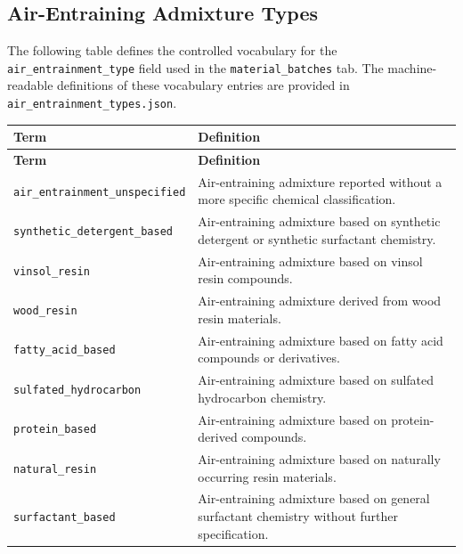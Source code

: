 \documentclass[11pt]{book}
\begin{document}
{\subsection{Air-Entraining Admixture Types}
\label{vocab:air_entrainment_type_list}

The following table defines the controlled vocabulary for the \texttt{air\_entrainment\_type} field used in the \texttt{material\_batches} tab. The machine-readable definitions of these vocabulary entries are provided in \texttt{air\_entrainment\_types.json}.

\begin{longtable}{p{}p{}}
\hline
\textbf{Term} & \textbf{Definition} \\
\hline
\endfirsthead

\hline
\textbf{Term} & \textbf{Definition} \\
\hline
\endhead

\texttt{air\_entrainment\_unspecified} &
Air-entraining admixture reported without a more specific chemical classification. \\

\texttt{synthetic\_detergent\_based} &
Air-entraining admixture based on synthetic detergent or synthetic surfactant chemistry. \\

\texttt{vinsol\_resin} &
Air-entraining admixture based on vinsol resin compounds. \\

\texttt{wood\_resin} &
Air-entraining admixture derived from wood resin materials. \\

\texttt{fatty\_acid\_based} &
Air-entraining admixture based on fatty acid compounds or derivatives. \\

\texttt{sulfated\_hydrocarbon} &
Air-entraining admixture based on sulfated hydrocarbon chemistry. \\

\texttt{protein\_based} &
Air-entraining admixture based on protein-derived compounds. \\

\texttt{natural\_resin} &
Air-entraining admixture based on naturally occurring resin materials. \\

\texttt{surfactant\_based} &
Air-entraining admixture based on general surfactant chemistry without further specification. \\


\end{longtable}}
\end{document}
